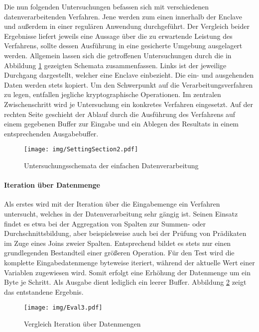 Die nun folgenden Untersuchungen befassen sich mit verschiedenen datenverarbeitenden Verfahren. Jene werden zum einen innerhalb der Enclave und außerdem in einer regulären Anwendung durchgeführt. Der Vergleich beider Ergebnisse liefert jeweils eine Aussage über die zu erwartende Leistung des Verfahrens, sollte dessen Ausführung in eine gesicherte Umgebung ausgelagert werden. Allgemein lassen sich die getroffenen Untersuchungen durch die in Abbildung \ref{fig:settingsection2} gezeigten Schemata zusammenfassen. Links ist der jeweilige Durchgang dargestellt, welcher eine Enclave einbezieht. Die ein- und ausgehenden Daten werden stets kopiert. Um den Schwerpunkt auf die Verarbeitungsverfahren zu legen, entfallen jegliche kryptographische Operationen. Im zentralen Zwischenschritt wird je Untersuchung ein konkretes Verfahren eingesetzt. Auf der rechten Seite geschieht der Ablauf durch die Ausführung des Verfahrens auf einem gegebenen Buffer zur Eingabe und ein Ablegen des Resultats in einem entsprechenden Ausgabebuffer.

\begin{figure}[H]
	\texttt{[image: img/SettingSection2.pdf]}
	\centering
	\caption{Untersuchungsschemata der einfachen Datenverarbeitung}
	\label{fig:settingsection2}
\end{figure}

\paragraph{Iteration über Datenmenge}

Als erstes wird mit der Iteration über die Eingabemenge ein Verfahren untersucht, welches in der Datenverarbeitung sehr gängig ist. Seinen Einsatz findet es etwa bei der Aggregation von Spalten zur Summen- oder Durchschnittsbildung, aber beispielsweise auch bei der Prüfung von Prädikaten im Zuge eines Joins zweier Spalten. Entsprechend bildet es stets nur einen grundlegenden Bestandteil einer größeren Operation. Für den Test wird die komplette Eingabedatenmenge byteweise iteriert, während der aktuelle Wert einer Variablen zugewiesen wird. Somit erfolgt eine Erhöhung der Datenmenge um ein Byte je Schritt. Als Ausgabe dient lediglich ein leerer Buffer. Abbildung \ref{fig:eval3} zeigt das entstandene Ergebnis.

\begin{figure}[H]
	\texttt{[image: img/Eval3.pdf]}
	\centering
	\caption{Vergleich Iteration über Datenmengen}
	\label{fig:eval3}
\end{figure}

